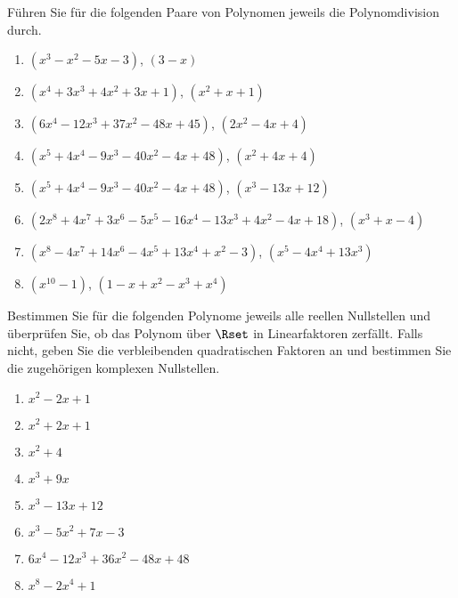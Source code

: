 
Führen Sie für die folgenden Paare von Polynomen jeweils die Polynomdivision durch.
\begin{enumerate}
\item $(x^3-x^2-5x-3)$, $(3-x)$
\item $(x^4+3x^3+4x^2+3x+1)$, $(x^2+x+1)$
\item $(6 x^4-12 x^3+37 x^2-48 x+45)$, $(2 x^2-4 x+4)$
\item $(x^5+4 x^4-9 x^3-40 x^2-4 x+48)$, $(x^2+4x+4)$
\item $(x^5+4 x^4-9 x^3-40 x^2-4 x+48)$, $(x^3-13 x+12)$
\item $(2 x^8+4 x^7+3 x^6-5 x^5-16 x^4-13 x^3+4 x^2-4 x+18)$, $(x^3+x-4)$
\item $(x^8-4 x^7+14 x^6-4 x^5+13 x^4+x^2-3)$, $(x^5-4 x^4+13 x^3)$
\item $(x^{10}-1)$, $(1 - x + x^2 - x^3 + x^4)$
\end{enumerate}




Bestimmen Sie für die folgenden Polynome jeweils alle reellen Nullstellen und überprüfen Sie, ob das Polynom über $\Rset$ in Linearfaktoren zerfällt. Falls nicht, geben Sie die verbleibenden quadratischen Faktoren an und bestimmen Sie die zugehörigen komplexen Nullstellen.\\
\parbox{0.5\textwidth}{\begin{enumerate}
\item $x^2-2x+1$
\item $x^2+2x+1$ 
\item $x^2+4$
\item $x^3+9x$
\end{enumerate}}\parbox{0.5\textwidth}{\begin{enumerate}\setcounter{enumi}{4}
\item $x^3-13 x+12$
\item $x^3-5 x^2+7 x-3$
\item $6 x^4-12 x^3+36 x^2-48 x+48$ 
\item $x^8 - 2 x^4 + 1$
\end{enumerate}}

\pagebreak


